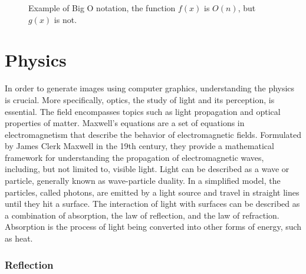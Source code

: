 \begin{figure}[H]
  \centering
  \caption{Example of Big O notation, the function $f(x)$ is $O(n)$, but $g(x)$ is not.}
  \label{fig:big-o-visualization}
\end{figure}

\section{Physics}
\label{ch:physics}

In order to generate images using computer graphics, understanding the physics is crucial. More specifically, optics, the study of light and its perception, is essential. The field encompasses topics such as light propagation and optical properties of matter. Maxwell's equations are a set of equations in electromagnetism that describe the behavior of electromagnetic fields. Formulated by James Clerk Maxwell in the 19th century, they provide a mathematical framework for understanding the propagation of electromagnetic waves, including, but not limited to, visible light. Light can be described as a wave or particle, generally known as wave-particle duality. \cite{fowles1989introduction} In a simplified model, the particles, called photons, are emitted by a light source and travel in straight lines until they hit a surface. The interaction of light with surfaces can be described as a combination of absorption, the law of reflection, and the law of refraction. Absorption is the process of light being converted into other forms of energy, such as heat.

\subsubsection{Reflection}

